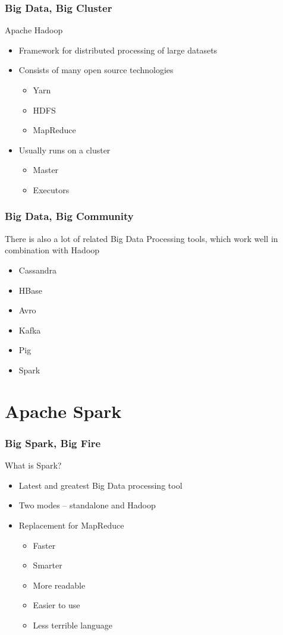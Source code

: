 \documentclass{beamer}
\begin{document}
\begin{frame}
\frametitle{Big Data, Big Cluster}
Apache Hadoop

\begin{itemize}
    \item Framework for distributed processing of large datasets
    \item Consists of many open source technologies
        \begin{itemize}
            \item Yarn
            \item HDFS
            \item MapReduce
        \end{itemize}
    \item Usually runs on a cluster
        \begin{itemize}
            \item Master
            \item Executors
        \end{itemize}
\end{itemize}
\end{frame}

\begin{frame}
\frametitle{Big Data, Big Community}
There is also a lot of related Big Data Processing tools, which work well in combination with Hadoop

\begin{itemize}
    \item Cassandra
    \item HBase
    \item Avro
    \item Kafka
    \item Pig
    \item Spark
\end{itemize}
\end{frame}

\section{Apache Spark}

\begin{frame}
\frametitle{Big Spark, Big Fire}
What is Spark?
\begin{itemize}
    \item Latest and greatest Big Data processing tool
    \item Two modes -- standalone and Hadoop
    \item Replacement for MapReduce
        \begin{itemize}
            \item Faster
            \item Smarter
            \item More readable
            \item Easier to use
            \item Less terrible language
        \end{itemize}
\end{itemize}
\end{frame}
\end{document}
